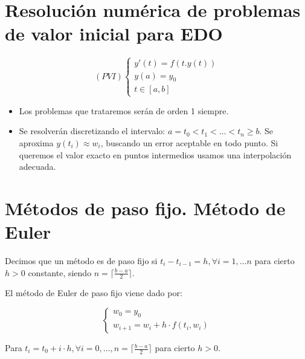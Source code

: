 
\section{Resolución numérica de problemas de valor inicial para EDO}

\begin{equation}
(PVI)
\begin{cases}
    y'(t)=f(t.y(t)) \\
    y(a) = y_0 \\
    t\in[a,b]
\end{cases}
\end{equation}
\begin{itemize}
        \item Los problemas que trataremos serán de orden 1 siempre.
        \item Se resolverán discretizando el intervalo: $a=t_0<t_1<\dots < t_n\geq b$. Se aproxima $y(t_i)\approx w_i$, buscando un error aceptable en todo punto. Si queremos el valor exacto en puntos intermedios usamos una interpolación adecuada.
\end{itemize}

\section{Métodos de paso fijo. Método de Euler}

\begin{definition} Decimos que un método es de paso fijo si $t_i-t_{i-1}=h,\forall i=1,\dots n$ para cierto $h>0$ constante, siendo $n=\lceil \frac{b-a}{2} \rceil$. \end{definition}

\begin{definition} 
El método de Euler de paso fijo viene dado por:

\begin{equation}
\begin{cases}
    w_0=y_0 \\
    w_{i+1}=w_i + h\cdot f(t_i, w_i)
\end{cases}
\end{equation}

Para $t_i =t_0+i\cdot h,\forall i=0,\dots, n=\lceil \frac{b-a}{2} \rceil$ para cierto $h>0$.

\end{definition}

